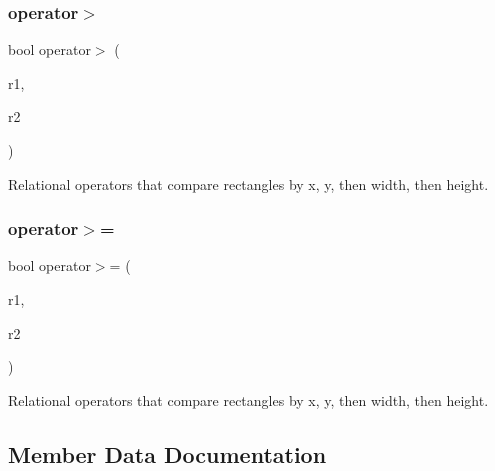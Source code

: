 \subsubsection{\texorpdfstring{operator$>$}{operator>}}
{\footnotesize\ttfamily bool operator$>$ (\begin{DoxyParamCaption}\item[{const \mbox{\hyperlink{structsgl_1_1GRectangle}{G\+Rectangle}} \&}]{r1,  }\item[{const \mbox{\hyperlink{structsgl_1_1GRectangle}{G\+Rectangle}} \&}]{r2 }\end{DoxyParamCaption})\hspace{0.3cm}{\ttfamily [friend]}}



Relational operators that compare rectangles by x, y, then width, then height. 

\mbox{\label{structsgl_1_1GRectangle_a206b248cb2a1fdece41beb61e5d41904}} 
\subsubsection{\texorpdfstring{operator$>$=}{operator>=}}
{\footnotesize\ttfamily bool operator$>$= (\begin{DoxyParamCaption}\item[{const \mbox{\hyperlink{structsgl_1_1GRectangle}{G\+Rectangle}} \&}]{r1,  }\item[{const \mbox{\hyperlink{structsgl_1_1GRectangle}{G\+Rectangle}} \&}]{r2 }\end{DoxyParamCaption})\hspace{0.3cm}{\ttfamily [friend]}}



Relational operators that compare rectangles by x, y, then width, then height. 



\subsection{Member Data Documentation}
\mbox{\label{structsgl_1_1GRectangle_a89f6abd564014faeff7cd20c340a9c7d}} 
